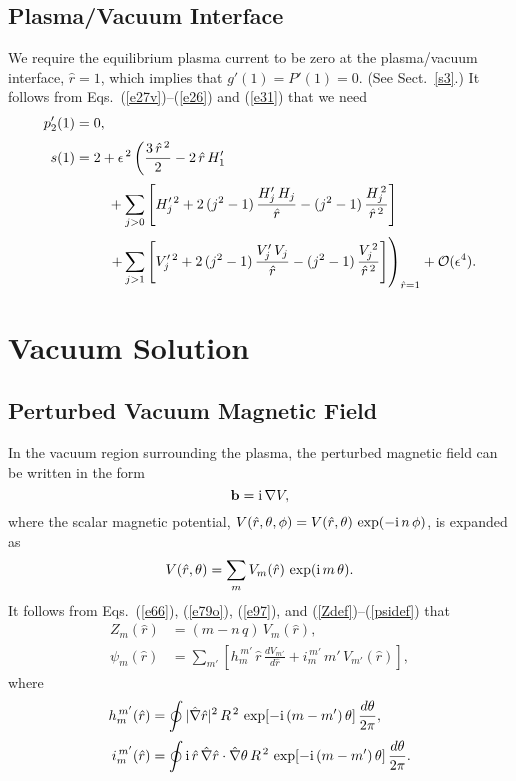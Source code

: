 \documentclass[12pt,prb,aps]{revtex4-1}
\begin{document}
\subsection{Plasma/Vacuum Interface}
We require the equilibrium plasma current to be zero at the plasma/vacuum interface, $\hat{r}=1$, which
implies that $g'(1)=P'(1)= 0$. (See Sect.~\ref{s3}.) It follows from Eqs.~(\ref{e27v})--(\ref{e26}) and (\ref{e31}) that we need\,\cite{am1}
\begin{align}
p_2'(1) &= 0,\label{e222}\\[0.5ex]
s(1) &= 2+ \epsilon^{\,2}\left(\frac{3\,\hat{r}^{\,2}}{2}-2\,\hat{r}\,H_1'\right.\nonumber\\[0.5ex]
&\phantom{===}
+\sum_{j>0}\left[H_j'^{\,2}+2\,(j^2-1)\,\frac{H_j'\,H_j}{\hat{r}}-(j^2-1)\,\frac{H_j^{\,2}}{\hat{r}^{\,2}}\right]\nonumber\\[0.5ex]
&\phantom{===}\left.+\sum_{j>1}\left[V_j'^{\,2}+2\,(j^2-1)\,\frac{V_j'\,V_j}{\hat{r}}-(j^2-1)\,\frac{V_j^{\,2}}{\hat{r}^{\,2}}\right]\right)_{\hat{r}=1}
+{\cal O}(\epsilon^4).\label{e223}
\end{align}

\section{Vacuum Solution}
\subsection{Perturbed Vacuum Magnetic Field}
In the vacuum region surrounding the plasma, the perturbed magnetic field can be written in the form\,\cite{am1}
\begin{equation}
{\bf b} = {\rm i}\,\nabla V,
\end{equation}
where the scalar magnetic potential, $V(\hat{r},\theta,\phi)= V(\hat{r},\theta)\,\exp(-{\rm i}\,n\,\phi)$,  is expanded as 
\begin{equation}\label{e225}
V(\hat{r},\theta) = \sum_{m}V_m(\hat{r})\,\exp({\rm i}\,m\,\theta).
\end{equation}
It follows from Eqs.~(\ref{e66}), (\ref{e79o}), (\ref{e97}), and (\ref{Zdef})--(\ref{psidef}) that
\begin{align}
Z_m(\hat{r})&= (m-n\,q)\,V_m(\hat{r}),\label{evdef}\\[0.5ex]
\psi_m(\hat{r}) &= \sum_{m'}\left[h_m^{\,m'}\,\hat{r}\,\frac{dV_{m'}}{d\hat{r}}+ i_{m}^{\,m'}\,m'\,V_{m'}(\hat{r})\right],
\end{align}
where
\begin{align}
h_m^{\,m'}(\hat{r})&= \oint |\hat{\nabla}\hat{r}|^2\,R^{\,2}\,\exp[-{\rm i}\,(m-m')\,\theta]\,\frac{d\theta}{2\pi},\\[0.5ex]
i_m^{\,m'}(\hat{r})&= \oint {\rm i}\,\hat{r}\,\hat{\nabla} \hat{r}\cdot\hat{\nabla}\theta\,R^{\,2} \,\exp[-{\rm i}\,(m-m')\,\theta]\,\frac{d\theta}{2\pi}.\label{e229}
\end{align}
\end{document}
